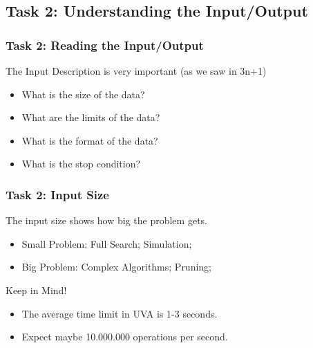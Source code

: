 \subsection{Task 2: Understanding the Input/Output}

\begin{frame}
  \frametitle{Task 2: Reading the Input/Output}

  The Input Description is \alert{very important} (as we saw in 3n+1)

  \bigskip

  {\small
  \begin{itemize}
  \item What is the size of the data?
  \item What are the limits of the data?
  \item What is the format of the data?
  \item What is the stop condition?
  \end{itemize}
  }
\end{frame}

\begin{frame}
  \frametitle{Task 2: Input Size}

  The input size shows how big the problem gets.

  \begin{itemize}
  \item Small Problem: Full Search; Simulation;
  \item Big Problem: Complex Algorithms; Pruning;
  \end{itemize}

  \begin{block}{Keep in Mind!}
    \begin{itemize}
    \item The average time limit in UVA is 1-3 seconds.
    \item Expect maybe 10.000.000 operations per second.
    \end{itemize}
  \end{block}
\end{frame}

